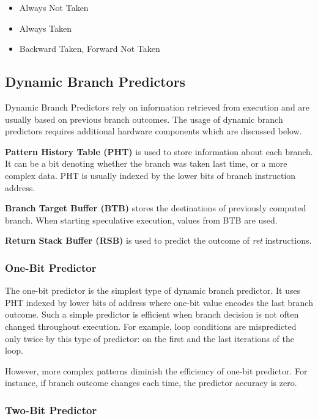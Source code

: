 \begin{itemize}
    \item Always Not Taken
    \item Always Taken
    \item Backward Taken, Forward Not Taken
\end{itemize}


\subsection{Dynamic Branch Predictors}

Dynamic Branch Predictors rely on information retrieved from execution and are usually based on previous branch outcomes. The usage of dynamic branch predictors requires additional hardware components which are discussed below.

\textbf{Pattern History Table (PHT)} is used to store information about each branch. It can be a bit denoting whether the branch was taken last time, or a more complex data. PHT is usually indexed by the lower bits of branch instruction address.

\textbf{Branch Target Buffer (BTB)} stores the destinations of previously computed branch. When starting speculative execution, values from BTB are used.

\textbf{Return Stack Buffer (RSB)} is used to predict the outcome of \textit{ret} instructions.

\subsubsection{One-Bit Predictor}

The one-bit predictor is the simplest type of dynamic branch predictor. It uses PHT indexed by lower bits of address where one-bit value encodes the last branch outcome. Such a simple predictor is efficient when branch decision is not often changed throughout execution. For example, loop conditions are mispredicted only twice by this type of predictor: on the first and the last iterations of the loop.

However, more complex patterns diminish the efficiency of one-bit predictor. For instance, if branch outcome changes each time, the predictor accuracy is zero.

\subsubsection{Two-Bit Predictor}

